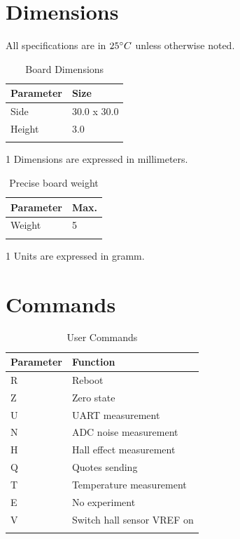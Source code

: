 \documentclass[10pt]{datasheet}
\begin{document}
\section{Dimensions}
All specifications are in $25\degree C$  unless otherwise noted.
\begin{table}[h]
\caption{Board Dimensions}
\begin{tabularx}{\textwidth}{l | X}
    \thickhline
    \textbf{Parameter} & \textbf{Size} \hspace{5cm} \\
    \hline
    Side & 30.0 x 30.0  \\
	Height & 3.0 \\
    \thickhline
\end{tabularx}
	\begin{tablenotes}
	\item[1]{Dimensions are expressed in millimeters.}
	\end{tablenotes}
\end{table}


\begin{table}[h]
\caption{Precise board weight}
\begin{tabularx}{\textwidth}{l | X}
    \thickhline
	\textbf{Parameter} & \textbf{Max.}  \hspace{5cm} \\
    \hline
	Weight & 5 \\
	
    \thickhline
\end{tabularx}
	\begin{tablenotes}
	\item[1]{Units are expressed in gramm.}
	\end{tablenotes}
\end{table}

\newpage

\section{Commands}
\begin{table}[h]
\caption{User Commands}
\begin{tabularx}{\textwidth}{l | X}
    \thickhline
    \textbf{Parameter} & \textbf{Function} \hspace{5cm} \\
    \hline
   	R & Reboot \\
	Z & Zero state \\
	U & UART measurement\\
	N & ADC noise measurement\\
	H & Hall effect measurement\\
	Q & Quotes sending\\
	T & Temperature measurement\\
	E & No experiment\\
	V & Switch hall sensor VREF on\\
    \thickhline
\end{tabularx}
\end{table}
\end{document}
